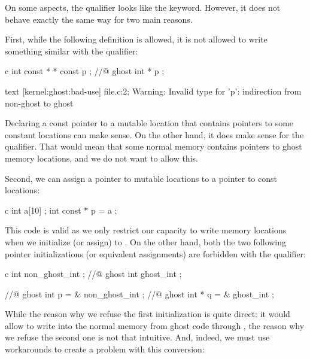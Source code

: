

On some aspects, the  qualifier
looks like the  keyword. However, it does not
behave exactly the same way for two main reasons.


First, while the following  definition is allowed,
it is not allowed to write something similar with the
 qualifier:


\begin{CodeBlock}{c}
int const * * const p ;
//@ ghost int \ghost * * p ;
\end{CodeBlock}


\begin{CodeBlock}{text}
[kernel:ghost:bad-use] file.c:2: Warning:
  Invalid type for 'p': indirection from non-ghost to ghost
\end{CodeBlock}


Declaring a const pointer to a mutable location that contains pointers
to some constant locations can make sense. On the other hand, it does
make sense for the  qualifier. That
would mean that some normal memory contains pointers to ghost memory
locations, and we do not want to allow this.


Second, we can assign a pointer to mutable locations to a pointer to
const locations:


\begin{CodeBlock}{c}
int a[10] ;
int const * p = a ;
\end{CodeBlock}


This code is valid as we only restrict our capacity to write memory
locations when we initialize (or assign)  to .
On the other hand, both the two following pointer initializations
(or equivalent assignments) are forbidden with the
 qualifier:


\begin{CodeBlock}{c}
int non_ghost_int ;
//@ ghost int ghost_int ;

//@ ghost int \ghost * p = & non_ghost_int ;
//@ ghost int * q = & ghost_int ;
\end{CodeBlock}


While the reason why we refuse the first initialization is quite direct:
it would allow to write into the normal memory from ghost code through
, the reason why we refuse the second one is not that
intuitive. And, indeed, we must use workarounds to create a problem with
this conversion:



